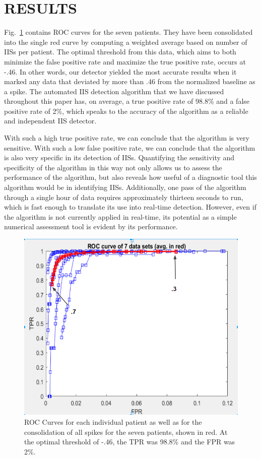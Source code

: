\documentclass[letterpaper, 10pt, conference]{ieeeconf}      %
\begin{document}
\section{RESULTS}
Fig.~\ref{fig5} contains ROC curves for the seven patients. They have been consolidated into the single red curve by computing a weighted average based on number of IISs per patient. The optimal threshold from this data, which aims to both minimize the false positive rate and maximize the true positive rate, occurs at -.46. In other words, our detector yielded the most accurate results when it marked any data that deviated by more than .46 from the normalized baseline as a spike. The automated IIS detection algorithm that we have discussed throughout this paper has, on average, a true positive rate of 98.8\% and a false positive rate of 2\%, which speaks to the accuracy of the algorithm as a reliable and independent IIS detector. 

With such a high true positive rate, we can conclude that the algorithm is very sensitive. With such a low false positive rate, we can conclude that the algorithm is also very specific in its detection of IISs. Quantifying the sensitivity and specificity of the algorithm in this way not only allows us to assess the performance of the algorithm, but also reveals how useful of a diagnostic tool this algorithm would be in identifying IISs. Additionally, one pass of the algorithm through a single hour of data requires approximately thirteen seconds to run, which is fast enough to translate its use into real-time detection. However, even if the algorithm is not currently applied in real-time, its potential as a simple numerical assessment tool is evident by its performance.

\begin{figure}
    \centering
    \includegraphics[scale = .42]{ROC.png}
    \caption{ROC Curves for each individual patient as well as for the consolidation of all spikes for the seven patients, shown in red. At the optimal threshold of -.46, the TPR was 98.8\% and the FPR was 2\%.}
    \label{fig5}
\end{figure}
\end{document}
